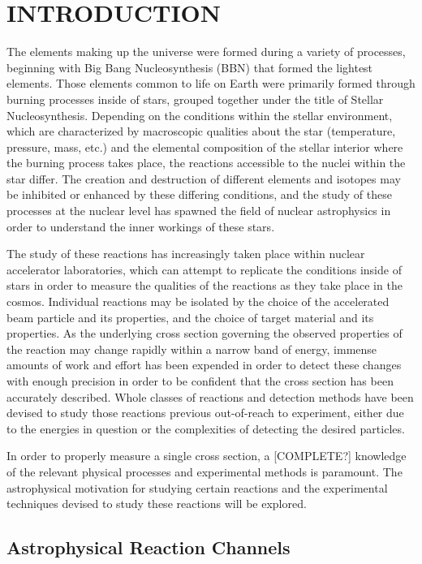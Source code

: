 \chapter{INTRODUCTION}

The elements making up the universe were formed during a variety of processes,
beginning with Big Bang Nucleosynthesis (BBN) that formed the lightest
elements. Those elements common to life on Earth were primarily formed through
burning processes inside of stars, grouped together under the title of
Stellar Nucleosynthesis. Depending on the conditions within the stellar
environment, which are characterized by macroscopic qualities about the star
(temperature, pressure, mass, etc.) and the elemental composition of the
stellar interior where the burning process takes place, the reactions
accessible to the nuclei within the star differ. The creation and destruction
of different elements and isotopes may be inhibited or enhanced by these
differing conditions, and the study of these processes at the nuclear level
has spawned the field of nuclear astrophysics in order to understand the inner
workings of these stars.

The study of these reactions has increasingly taken place within nuclear
accelerator laboratories, which can attempt to replicate the conditions inside
of stars in order to measure the qualities of the reactions as they take place
in the cosmos. Individual reactions may be isolated by the choice of the
accelerated beam particle and its properties, and the choice of target material
and its properties. As the underlying cross section governing the observed
properties of the reaction may change rapidly within a narrow band of energy,
immense amounts of work and effort has been expended in order to detect these
changes with enough precision in order to be confident that the cross section
has been accurately described. Whole classes of reactions and detection methods
have been devised to study those reactions previous out-of-reach to experiment,
either due to the energies in question or the complexities of detecting the
desired particles.

In order to properly measure a single cross section, a [COMPLETE?] knowledge of
the relevant physical processes and experimental methods is paramount. The
astrophysical motivation for studying certain reactions and the experimental
techniques devised to study these reactions will be explored.



\section{Astrophysical Reaction Channels}
\label{sec:ch01-astrophysical-reaction-channels}

